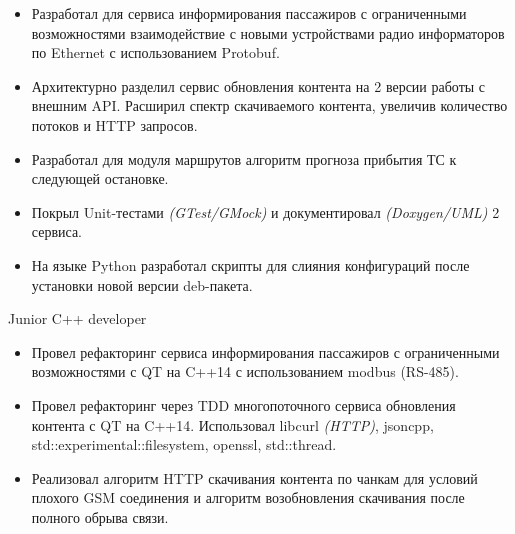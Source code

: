 {    \smallskip
    \begin{itemize}

        \item
            Разработал для сервиса информирования пассажиров с ограниченными возможностями
            взаимодействие с новыми устройствами радио информаторов по Ethernet с использованием
            Protobuf.

        \item
            Архитектурно разделил сервис обновления контента на 2 версии работы с внешним API.
            Расширил спектр скачиваемого контента, увеличив количество потоков и HTTP запросов.

        \item
            Разработал для модуля маршрутов алгоритм прогноза прибытия ТС к следующей остановке.

        \item
            Покрыл Unit-тестами \textit{(GTest/GMock)} и документировал \textit{(Doxygen/UML)}
            2 сервиса.

        \item
            На языке Python разработал скрипты для слияния конфигураций после установки новой версии
            deb-пакета.


    \end{itemize}


    \cvexperiencePosition
        {Junior C++ developer}

    \cvexperiencePeriod
        {}

    \smallskip
    \begin{itemize}

        \item
            Провел рефакторинг сервиса информирования пассажиров с ограниченными возможностями
            с QT на C++14 с использованием modbus (RS-485).

        \item
            Провел рефакторинг через TDD многопоточного сервиса обновления контента с QT на C++14.
            Использовал libcurl \textit{(HTTP)}, jsoncpp, std::experimental::filesystem, openssl,
            std::thread.

        \item
            Реализовал алгоритм HTTP скачивания контента по чанкам для условий плохого GSM
            соединения и алгоритм возобновления скачивания после полного обрыва связи.


\end{itemize}}

